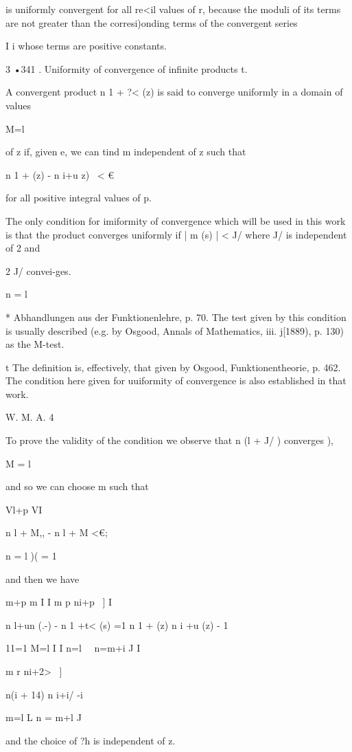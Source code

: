is uniformly convergent for all re<il values of r, because the moduli
of its terms are not greater than the corresi)onding terms of the
convergent series

I i whose terms are positive constants.

3 •341 . Uniformity of convergence of infinite products t.

A convergent product n 1 + ?< (z) is said to converge uniformly in a
domain of values

M=l

of z if, given e, we can tind m independent of z such that

n 1 + (z) - n i+u z) \ < €

for all positive integral values of p.

The only condition for imiformity of convergence which will be used in
this work is that the product converges uniformly if | m (s) | < J/
where J/ is independent of 2 and

2 J/ convei-ges.

n = l

* Abhandlungen aus der Funktionenlehre, p. 70. The test given by this
condition is usually described (e.g. by Osgood, Annals of Mathematics,
iii. j[1889), p. 130) as the M-test.

t The definition is, effectively, that given by Osgood,
Funktionentheorie, p. 462. The condition here given for uuiformity of
convergence is also established in that work.

W. M. A. 4

%
%

To prove the validity of the condition we observe that n (l + J/ )
converges ),

M = l

and so we can choose m such that

Vl+p VI

n l + M,, - n l + M <€;

n = l )( = 1

and then we have

m+p m I I m p ni+p ~] I

n l+un (.-) - n 1 +t< (s) =1 n 1 + (z) n i +u (z) - 1

11=1 M=l I I n=l \ \ n=m+i J I

m r ni+2> ~]

 n(i + 14) n i+i/ -i

m=l L n = m+l J

and the choice of ?h is independent of z.

